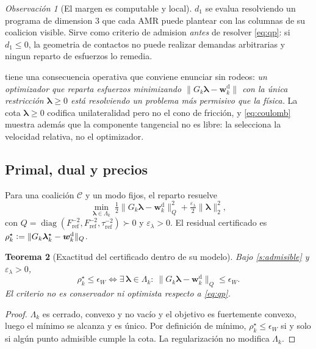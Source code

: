 \documentclass[11pt,a4paper]{article}
\theoremstyle{plain}
\newtheorem{teorema}{Teorema}[section]
\theoremstyle{definition}
\theoremstyle{remark}
\newtheorem{observacion}[teorema]{Observación}
\newcommand{\Ccal}{\mathcal{C}}
\newcommand{\Wdem}{\bm{w}^{\mathrm{d}}}
\newcommand{\defeq}{\vcentcolon=}
\begin{document}
\begin{observacion}[El margen es computable y local]
$d_1$ se evalua resolviendo un programa de dimension $3$ que cada AMR puede
plantear con las columnas de su coalicion visible. Sirve como criterio de
admision \emph{antes} de resolver \eqref{eq:qp}: si $d_1\le0$, la geometria de
contactos no puede realizar demandas arbitrarias y ningun reparto de esfuerzos
lo remedia.
\end{observacion}

 tiene una consecuencia operativa que conviene enunciar sin
rodeos: \emph{un optimizador que reparta esfuerzos minimizando
$\|G_k\bm\lambda-\Wdem_k\|$ con la única restricción $\bm\lambda\ge 0$ está
resolviendo un problema más permisivo que la física.} La cota
$\bm\lambda\ge0$ codifica unilateralidad pero no el cono de fricción, y
\eqref{eq:coulomb} muestra además que la componente tangencial no es libre: la
selecciona la velocidad relativa, no el optimizador.

\subsection{Primal, dual y precios}

Para una coalición $\Ccal$ y un modo fijos, el reparto resuelve
\begin{equation}
  \min_{\bm\lambda\in\Lambda_k}\
  \tfrac12\big\|G_k\bm\lambda-\Wdem_k\big\|_{Q}^{2}
  +\tfrac{\varepsilon_\lambda}{2}\|\bm\lambda\|_2^{2},
  \label{eq:qp}
\end{equation}
con $Q=\operatorname{diag}(F_{\mathrm{ref}}^{-2},F_{\mathrm{ref}}^{-2},
\tau_{\mathrm{ref}}^{-2})\succ0$ y $\varepsilon_\lambda>0$. El residual
certificado es
$\rho_k^{\star}\defeq\|G_k\bm\lambda_k^{\star}-\Wdem_k\|_{Q}$.

\begin{teorema}[Exactitud del certificado dentro de su modelo]
\label{th:cert}
Bajo \cref{s:admisible} y $\varepsilon_\lambda>0$,
\[
  \rho_k^{\star}\le\epsilon_W
  \iff
  \exists\,\bm\lambda\in\Lambda_k:\
  \|G_k\bm\lambda-\Wdem_k\|_{Q}\le\epsilon_W .
\]
El criterio no es conservador ni optimista respecto a \eqref{eq:qp}.
\end{teorema}

\begin{proof}
$\Lambda_k$ es cerrado, convexo y no vacío y el objetivo es fuertemente convexo,
luego el mínimo se alcanza y es único. Por definición de mínimo,
$\rho_k^\star\le\epsilon_W$ si y solo si algún punto admisible cumple la cota.
La regularización no modifica $\Lambda_k$.
\end{proof}
\end{document}
